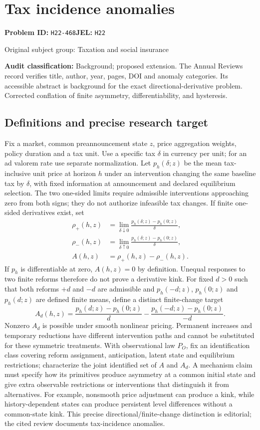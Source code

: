 \documentclass[11pt,a4paper]{article}
\begin{document}
\section*{Tax incidence anomalies}
\textbf{Problem ID:} \texttt{H22-468}\quad \textbf{JEL:} \texttt{H22}\par
\label{problem:OP-0476}
{\sffamily\small\color{muted}Original subject group: Taxation and social insurance\par}
\label{definitions:problem:30007758}
\textbf{Audit classification:} Background; proposed extension. The Annual Reviews record verifies title, author, year, pages, DOI and anomaly categories. Its accessible abstract is background for the exact directional-derivative problem. Corrected conflation of finite asymmetry, differentiability, and hysteresis.
\subsection*{Definitions and precise research target}
Fix a market, common preannouncement state \(z\), price aggregation weights, policy duration and a tax unit. Use a specific tax \(\delta\) in currency per unit; for an ad valorem rate use separate normalization. Let \(p_h(\delta;z)\) be the mean tax-inclusive unit price at horizon \(h\) under an intervention changing the same baseline tax by \(\delta\), with fixed information at announcement and declared equilibrium selection. The two one-sided limits require admissible interventions approaching zero from both signs; they do not authorize infeasible tax changes. If finite one-sided derivatives exist, set
\[
\begin{aligned}
 \rho_+(h,z)&=\lim_{\delta\downarrow0}\frac{p_h(\delta;z)-p_h(0;z)}{\delta},\\
 \rho_-(h,z)&=\lim_{\delta\uparrow0}\frac{p_h(\delta;z)-p_h(0;z)}{\delta},\\
 A(h,z)&=\rho_+(h,z)-\rho_-(h,z).
\end{aligned}
\]
If \(p_h\) is differentiable at zero, \(A(h,z)=0\) by definition. Unequal responses to two finite reforms therefore do not prove a derivative kink. For fixed \(d>0\) such that both reforms \(+d\) and \(-d\) are admissible and \(p_h(-d;z)\), \(p_h(0;z)\) and \(p_h(d;z)\) are defined finite means, define a distinct finite-change target
\[
 A_d(h,z)=\frac{p_h(d;z)-p_h(0;z)}d
 -\frac{p_h(-d;z)-p_h(0;z)}{-d}.
\]
Nonzero \(A_d\) is possible under smooth nonlinear pricing. Permanent increases and temporary reductions have different intervention paths and cannot be substituted for these symmetric treatments. With observational law \(P_O\), fix an identification class covering reform assignment, anticipation, latent state and equilibrium restrictions; characterize the joint identified set of \(A\) and \(A_d\). A mechanism claim must specify how its primitives produce asymmetry at a common initial state and give extra observable restrictions or interventions that distinguish it from alternatives. For example, nonsmooth price adjustment can produce a kink, while history-dependent states can produce persistent level differences without a common-state kink. This precise directional/finite-change distinction is editorial; the cited review documents tax-incidence anomalies.
\end{document}
